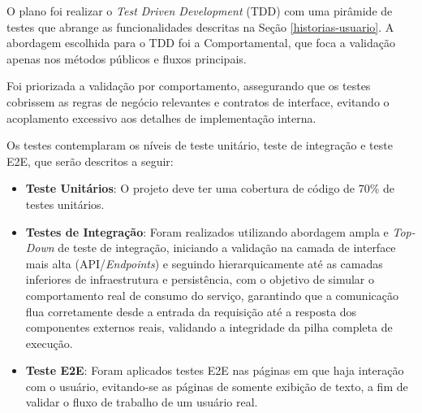 O plano foi realizar o \textit{Test Driven Development} (TDD) com uma pirâmide de testes que abrange as funcionalidades descritas na Seção \ref{historias-usuario}. A abordagem escolhida para o TDD foi a Comportamental, que foca a validação apenas nos métodos públicos e fluxos principais. 

Foi priorizada a validação por comportamento, assegurando que os testes cobrissem as regras de negócio relevantes e contratos de interface, evitando o acoplamento excessivo aos detalhes de implementação interna.

Os testes contemplaram os níveis de teste unitário, teste de integração e teste E2E, que serão descritos a seguir:

\begin{itemize}

\item \textbf{Teste Unitários}: O projeto deve ter uma cobertura de código de 70\% de testes unitários.

\item \textbf{Testes de Integração}: Foram realizados utilizando abordagem ampla e \textit{Top-Down} de teste de integração, iniciando a validação na camada de interface mais alta (API/\textit{Endpoints}) e seguindo hierarquicamente até as camadas inferiores de infraestrutura e persistência, com o objetivo de simular o comportamento real de consumo do serviço, garantindo que a comunicação flua corretamente desde a entrada da requisição até a resposta dos componentes externos reais, validando a integridade da pilha completa de execução.


\item \textbf{Teste E2E}: Foram aplicados testes E2E nas páginas em que haja interação com o usuário, evitando-se as páginas de somente exibição de texto, a fim de validar o fluxo de trabalho de um usuário real.

\end{itemize}

